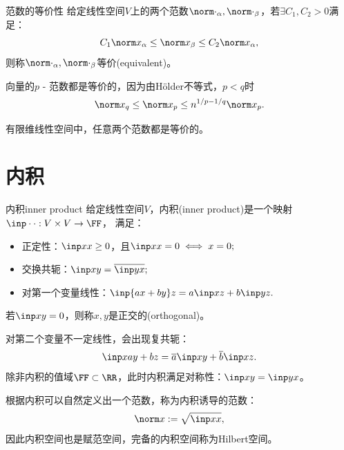 \begin{definition}
    {范数的等价性}{}
    给定线性空间$V$上的两个范数$\norm\cdot_\alpha,\norm\cdot_\beta$，若$\exists C_1,C_2>0$满足：
    \[
        C_1\norm x_\alpha\leq\norm x_\beta\leq C_2\norm x_\alpha,
    \]
    则称$\norm\cdot_\alpha,\norm\cdot_\beta$等价(equivalent)。
\end{definition}

\begin{corollary}
    向量的$p$ - 范数都是等价的，因为由H\"older不等式，$p<q$时
    \begin{equation}
        \norm x_q\leq\norm x_p\leq n^{1/p-1/q}\norm x_p.
    \end{equation}
\end{corollary}

\begin{theorem}
    {}{}
    有限维线性空间中，任意两个范数都是等价的。
\end{theorem}


\section{内积}
\label{sec:inner product}

\begin{definition}
    {内积}{inner product}
    给定线性空间$V$，内积(inner product)是一个映射$\inp\cdot\cdot:V\times V\to\FF$，
    满足：
    \begin{itemize}
        \item 正定性：$\inp xx\geq 0$，且$\inp xx=0\iff x=0;$
        \item 交换共轭：$\inp xy=\overline{\inp yx};$
        \item 对第一个变量线性：$\inp{ax+by}z=a\inp xz+b\inp yz.$
    \end{itemize}
    若$\inp xy=0$，则称$x,y$是正交的(orthogonal)。
\end{definition}

\begin{remark}
    对第二个变量不一定线性，会出现复共轭：
    \[
        \inp x{ay+bz}=\overline a\inp xy+\overline b\inp xz.
    \]
    除非内积的值域$\FF\subset\RR$，此时内积满足对称性：$\inp xy=\inp yx$。
\end{remark}

\begin{corollary}
    根据内积可以自然定义出一个范数，称为内积诱导的范数：
    \begin{equation}
        \norm x:=\sqrt{\inp xx},
    \end{equation}
    因此内积空间也是赋范空间，完备的内积空间称为Hilbert空间。
\end{corollary}

